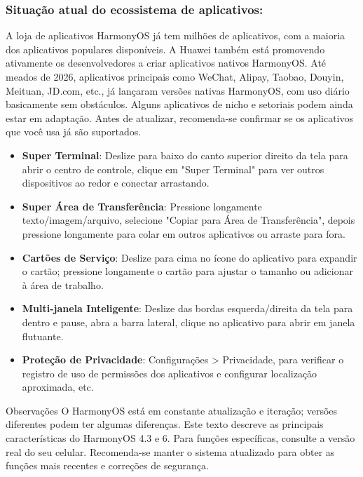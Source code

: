 \subsubsection*{Situação atual do ecossistema de aplicativos:}

A loja de aplicativos HarmonyOS já tem milhões de aplicativos, com a maioria dos aplicativos populares disponíveis. A Huawei também está promovendo ativamente os desenvolvedores a criar aplicativos nativos HarmonyOS. Até meados de 2026, aplicativos principais como WeChat, Alipay, Taobao, Douyin, Meituan, JD.com, etc., já lançaram versões nativas HarmonyOS, com uso diário basicamente sem obstáculos. Alguns aplicativos de nicho e setoriais podem ainda estar em adaptação. Antes de atualizar, recomenda-se confirmar se os aplicativos que você usa já são suportados.


\begin{itemize}
  \item \textbf{Super Terminal}: Deslize para baixo do canto superior direito da tela para abrir o centro de controle, clique em "Super Terminal" para ver outros dispositivos ao redor e conectar arrastando.
  \item \textbf{Super Área de Transferência}: Pressione longamente texto/imagem/arquivo, selecione "Copiar para Área de Transferência", depois pressione longamente para colar em outros aplicativos ou arraste para fora.
  \item \textbf{Cartões de Serviço}: Deslize para cima no ícone do aplicativo para expandir o cartão; pressione longamente o cartão para ajustar o tamanho ou adicionar à área de trabalho.
  \item \textbf{Multi-janela Inteligente}: Deslize das bordas esquerda/direita da tela para dentro e pause, abra a barra lateral, clique no aplicativo para abrir em janela flutuante.
  \item \textbf{Proteção de Privacidade}: Configurações > Privacidade, para verificar o registro de uso de permissões dos aplicativos e configurar localização aproximada, etc.
\end{itemize}

\begin{tcbwarn}{Observações}
O HarmonyOS está em constante atualização e iteração; versões diferentes podem ter algumas diferenças. Este texto descreve as principais características do HarmonyOS 4.3 e 6. Para funções específicas, consulte a versão real do seu celular. Recomenda-se manter o sistema atualizado para obter as funções mais recentes e correções de segurança.

\end{tcbwarn}

